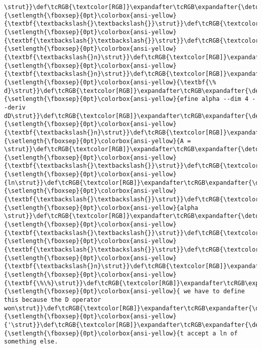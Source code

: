 \documentclass[landscape,letterpaper,10pt,english]{article}
\begin{document}
\begin{Verbatim}[commandchars=\\\{\}, frame=single, framerule=2mm, rulecolor=\color{outerrorbackground}]
\strut}}\def\tcRGB{\textcolor[RGB]}\expandafter\tcRGB\expandafter{\detokenize{175,95,0}}{\setlength{\fboxsep}{0pt}\colorbox{ansi-yellow}{\textbf{\textbackslash{}\textbackslash{}}\strut}}\def\tcRGB{\textcolor[RGB]}\expandafter\tcRGB\expandafter{\detokenize{175,95,0}}{\setlength{\fboxsep}{0pt}\colorbox{ansi-yellow}{\textbf{\textbackslash{}\textbackslash{}}\strut}}\def\tcRGB{\textcolor[RGB]}\expandafter\tcRGB\expandafter{\detokenize{175,95,0}}{\setlength{\fboxsep}{0pt}\colorbox{ansi-yellow}{\textbf{\textbackslash{}n}\strut}}\def\tcRGB{\textcolor[RGB]}\expandafter\tcRGB\expandafter{\detokenize{175,95,0}}{\setlength{\fboxsep}{0pt}\colorbox{ansi-yellow}{\textbf{\textbackslash{}n}\strut}}\def\tcRGB{\textcolor[RGB]}\expandafter\tcRGB\expandafter{\detokenize{175,95,135}}{\setlength{\fboxsep}{0pt}\colorbox{ansi-yellow}{\textbf{\% d}\strut}}\def\tcRGB{\textcolor[RGB]}\expandafter\tcRGB\expandafter{\detokenize{175,0,0}}{\setlength{\fboxsep}{0pt}\colorbox{ansi-yellow}{efine alpha --dim 4 --deriv dD\strut}}\def\tcRGB{\textcolor[RGB]}\expandafter\tcRGB\expandafter{\detokenize{175,95,0}}{\setlength{\fboxsep}{0pt}\colorbox{ansi-yellow}{\textbf{\textbackslash{}n}\strut}}\def\tcRGB{\textcolor[RGB]}\expandafter\tcRGB\expandafter{\detokenize{175,0,0}}{\setlength{\fboxsep}{0pt}\colorbox{ansi-yellow}{A = \strut}}\def\tcRGB{\textcolor[RGB]}\expandafter\tcRGB\expandafter{\detokenize{175,95,0}}{\setlength{\fboxsep}{0pt}\colorbox{ansi-yellow}{\textbf{\textbackslash{}\textbackslash{}}\strut}}\def\tcRGB{\textcolor[RGB]}\expandafter\tcRGB\expandafter{\detokenize{175,0,0}}{\setlength{\fboxsep}{0pt}\colorbox{ansi-yellow}{ln\strut}}\def\tcRGB{\textcolor[RGB]}\expandafter\tcRGB\expandafter{\detokenize{175,95,0}}{\setlength{\fboxsep}{0pt}\colorbox{ansi-yellow}{\textbf{\textbackslash{}\textbackslash{}}\strut}}\def\tcRGB{\textcolor[RGB]}\expandafter\tcRGB\expandafter{\detokenize{175,0,0}}{\setlength{\fboxsep}{0pt}\colorbox{ansi-yellow}{alpha \strut}}\def\tcRGB{\textcolor[RGB]}\expandafter\tcRGB\expandafter{\detokenize{175,95,0}}{\setlength{\fboxsep}{0pt}\colorbox{ansi-yellow}{\textbf{\textbackslash{}\textbackslash{}}\strut}}\def\tcRGB{\textcolor[RGB]}\expandafter\tcRGB\expandafter{\detokenize{175,95,0}}{\setlength{\fboxsep}{0pt}\colorbox{ansi-yellow}{\textbf{\textbackslash{}\textbackslash{}}\strut}}\def\tcRGB{\textcolor[RGB]}\expandafter\tcRGB\expandafter{\detokenize{175,95,0}}{\setlength{\fboxsep}{0pt}\colorbox{ansi-yellow}{\textbf{\textbackslash{}n}\strut}}\def\tcRGB{\textcolor[RGB]}\expandafter\tcRGB\expandafter{\detokenize{175,95,135}}{\setlength{\fboxsep}{0pt}\colorbox{ansi-yellow}{\textbf{\%\%}\strut}}\def\tcRGB{\textcolor[RGB]}\expandafter\tcRGB\expandafter{\detokenize{175,0,0}}{\setlength{\fboxsep}{0pt}\colorbox{ansi-yellow}{ we have to define this because the D operator won\strut}}\def\tcRGB{\textcolor[RGB]}\expandafter\tcRGB\expandafter{\detokenize{175,0,0}}{\setlength{\fboxsep}{0pt}\colorbox{ansi-yellow}{'\strut}}\def\tcRGB{\textcolor[RGB]}\expandafter\tcRGB\expandafter{\detokenize{175,0,0}}{\setlength{\fboxsep}{0pt}\colorbox{ansi-yellow}{t accept a ln of something else. 
\end{Verbatim}
\end{document}
